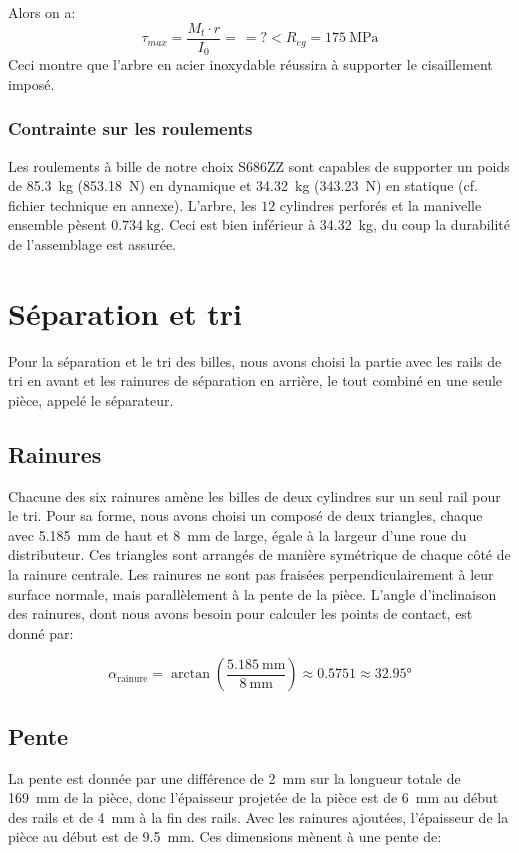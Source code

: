 Alors on a:
\[\tau_{max} = \frac{M_{t}\cdot r}{I_{0}} = \frac{}{} = ? < R_{eg} = \SI{175}{\mega\pascal}\]
Ceci montre que l'arbre en acier inoxydable réussira à supporter le cisaillement imposé.

\subsubsection{Contrainte sur les roulements}
Les roulements à bille de notre choix S686ZZ sont capables de supporter un poids de \SI{85.3}{\kg} (\SI{853.18}{N}) en dynamique et \SI{34.32}{\kg} (\SI{343.23}{N}) en statique (cf. fichier technique en annexe). L'arbre, les $12$ cylindres perforés et la manivelle ensemble pèsent $\SI{0.734}{\kg}$. Ceci est bien inférieur à \SI{34.32}{\kg}, du coup la durabilité de l'assemblage est assurée.
\section{Séparation et tri}
Pour la séparation et le tri des billes, nous avons choisi la partie avec les rails de tri en avant et les rainures de séparation en arrière, le tout combiné en une seule pièce, appelé le séparateur.

\subsection{Rainures}
Chacune des six rainures amène les billes de deux cylindres sur un seul rail pour le tri. Pour sa forme, nous avons choisi un composé de deux triangles, chaque avec \SI{5,185}{\milli\metre} de haut et \SI{8}{\milli\metre} de large, égale à la largeur d'une roue du distributeur. Ces triangles sont arrangés de manière symétrique de chaque côté de la rainure centrale. Les rainures ne sont pas fraisées perpendiculairement à leur surface normale, mais parallèlement à la pente de la pièce. L'angle d'inclinaison des rainures, dont nous avons besoin pour calculer les points de contact, est donné par:

\[\alpha_{\text{rainure}} = \arctan\left(\frac{\SI{5.185}{\milli\metre}}{\SI{8}{\milli\metre}}\right) \approx \num{0.5751} \approx \ang{32.95}\]

\subsection{Pente}
La pente est donnée par une différence de \SI{2}{\milli\metre} sur la longueur totale de \SI{169}{\milli\metre} de la pièce, donc l'épaisseur projetée de la pièce est de \SI{6}{\mm} au début des rails et de \SI{4}{\mm} à la fin  des rails. Avec les rainures ajoutées, l'épaisseur de la pièce au début est de \SI{9.5}{\mm}. Ces dimensions mènent à une pente de:

